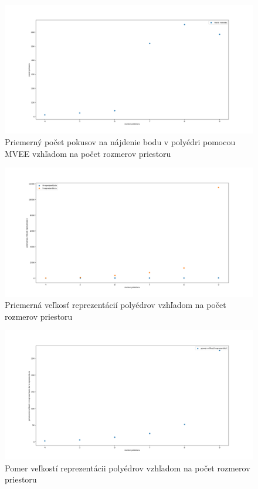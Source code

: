 \begin{figure} [H]
	\includegraphics[width=\linewidth]{images/mvee_pokusy.png}
	\caption{Priemerný počet pokusov na nájdenie bodu v polyédri pomocou MVEE vzhľadom na počet rozmerov priestoru}
	\label{fig:mvee_pokusy}
\end{figure}

\begin{figure} [H]
	\includegraphics[width=\linewidth]{images/velkost_rep.png}
	\caption{Priemerná veľkosť reprezentácií polyédrov vzhľadom na počet rozmerov priestoru}
	\label{fig:velkost_rep}
\end{figure}

\begin{figure} [H]
	\includegraphics[width=\linewidth]{images/pomer_rep.png}
	\caption{Pomer veľkostí reprezentácii polyédrov vzhľadom na počet rozmerov priestoru}
	\label{fig:pomer_rep}
\end{figure}

